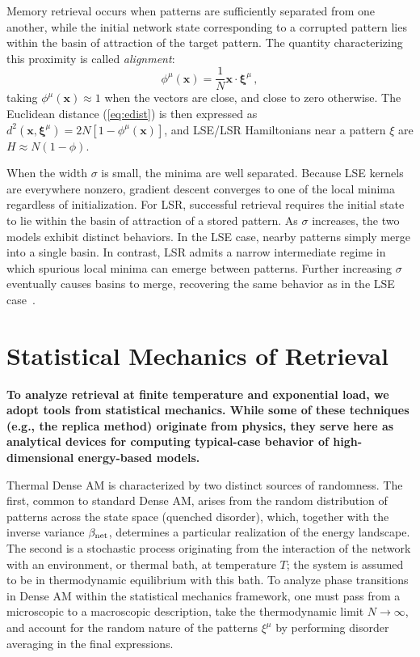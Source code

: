 \documentclass{article}
\theoremstyle{plain}
\theoremstyle{definition}
\theoremstyle{remark}
\begin{document}
Memory retrieval occurs when patterns are sufficiently separated from one another, while the initial network state corresponding to a corrupted pattern lies within the basin of attraction of the target pattern. The quantity characterizing this proximity is called \textit{alignment}:
\begin{equation}
    \phi^\mu(\bm{x}) = \frac{1}{N} \bm{x} \cdot \bm{\xi}^\mu\,,
    \label{eq:alignment}
\end{equation}
taking $\phi^\mu(\bm{x}) \approx 1$ when the vectors are close, and close to zero otherwise. The Euclidean distance (\ref{eq:edist}) is then expressed as $d^2(\bm{x}, \bm{\xi}^\mu) =2N [1- \phi^\mu(\bm{x}) ]$, and 
LSE/LSR Hamiltonians near a pattern $\xi$ are $H\approx N(1-\phi)$.

When the width $\sigma$ is small, the minima are well separated. Because LSE kernels are everywhere nonzero, gradient descent converges to one of the local minima regardless of initialization. For LSR, successful retrieval requires the initial state to lie within the basin of attraction of a stored pattern. As $\sigma$ increases, the two models exhibit distinct behaviors. In the LSE case, nearby patterns simply merge into a single basin. In contrast, LSR admits a narrow intermediate regime in which spurious local minima can emerge between patterns. Further increasing $\sigma$ eventually causes basins to merge, recovering the same behavior as in the LSE case~\cite{hoover2025dense}.

\section{Statistical Mechanics of Retrieval}

\textbf{To analyze retrieval at finite temperature and exponential load, we adopt tools from statistical mechanics. While some of these techniques (e.g., the replica method) originate from physics, they serve here as analytical devices for computing typical-case behavior of high-dimensional energy-based models.}


Thermal Dense AM is characterized by two distinct sources of randomness. The first, common to standard Dense AM, arises from the random distribution of patterns across the state space (quenched disorder), which, together with the inverse variance $\beta_{\rm net}$, determines a particular realization of the energy landscape. The second is a stochastic process originating from the interaction of the network with an environment, or thermal bath, at temperature $T$; the system is assumed to be in thermodynamic equilibrium with this bath. To analyze phase transitions in Dense AM within the statistical mechanics framework, one must pass from a microscopic to a macroscopic description, take the thermodynamic limit $N \to \infty$, and account for the random nature of the patterns $\xi^\mu$ by performing disorder averaging in the final expressions.
\end{document}
